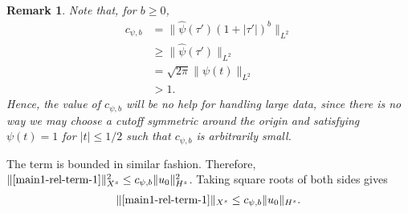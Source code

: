 \documentclass[12pt,reqno]{amsart}
\numberwithin{equation}{section}  %
\renewcommand{\cref}{\Cref}
\newcommand{\wh}{\widehat}
\newtheorem{remark}[theorem]{Remark}
\begin{document}
%
%
%
%
\begin{framed}
%
%
\begin{remark}
Note that, for $b \ge 0$,
%
%
\begin{equation*}
\begin{split}
  c_{\psi, b}
  & = \|\wh{\psi}(\tau') \left( 1 +  | \tau'|
  \right)^{b} \|_{L^{2}}
  \\
  & \ge \| \wh{\psi}(\tau') \|_{L^{2}}
  \\
  & = \sqrt{2 \pi} \|
  \psi(t) \|_{L^{2}}
  \\
  & > 1.
\end{split}
\end{equation*}
%
%
Hence, the value of $c_{\psi, b}$ will be no help for handling large data, since there is
no way we may choose a cutoff symmetric around the origin and satisfying
$\psi(t) =1$ for $| t | \le 1/2$ such that $c_{\psi, b}$ is arbitrarily small. 
\label{rem:value-schwartz-const}
\end{remark}
%
%
\end{framed}
%
%
%
%
The
term \cref{u-0-norm-comp-3} is bounded in similar fashion. Therefore, 
$\|\cref{main1-rel-term-1}\|_{X^{s}}^{2} \le c_{\psi,b} 
\|u_{0}\|_{H^s}^2$. Taking square roots of both sides gives
%
%
\begin{equation}
  \begin{split}
    \|\cref{main1-rel-term-1}\|_{X^{s}} \le c_{\psi,b} 
    \|u_{0}\|_{H^s}.
  \end{split}
  \label{eqn:u-0-fin-est}
\end{equation}
%
%
%
\end{document}

